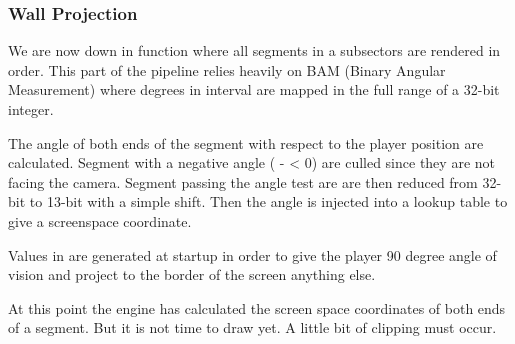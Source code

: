 \subsubsection{Wall Projection}
We are now down in  function where all segments in a subsectors are rendered in order. This part of the pipeline relies heavily on BAM (Binary Angular Measurement) where degrees in interval \cw{[0, 360]} are mapped in the full range of a 32-bit integer.\\
\par
{}
\par
The angle of both ends of the segment with respect to the player position are calculated. Segment with a negative angle ( -  < 0) are culled since they are not facing the camera. Segment passing the angle test are are then reduced from 32-bit to 13-bit with a simple shift. Then the angle is injected into a lookup table  to give a screenspace  coordinate.\\
 \par
\vspace{2mm}
\par
Values in  are generated at startup in order to give the player 90 degree angle of vision and project to the border of the screen anything else. 
\par
\vspace{1cm}
\par
At this point the engine has calculated the screen space  coordinates of both ends of a segment. But it is not time to draw yet. A little bit of clipping must occur. 






